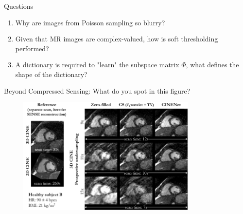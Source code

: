 \documentclass[aspectratio=169]{beamer}
\begin{document}
	\begin{frame}{Questions}
		\begin{enumerate}
			\item <1-> Why are images from Poisson sampling so blurry?
			
			\vspace{1em}
			\item <2-> Given that MR images are complex-valued, how is soft thresholding performed?
			
			\vspace{1em}
			\item <3-> A dictionary is required to "learn" the subspace matrix $\Phi$, what defines the shape of the dictionary?
		\end{enumerate}
	\end{frame}
	
	\begin{frame}{Beyond Compressed Sensing: What do you spot in this figure?}
		\begin{figure}
			\centering
			\includegraphics[width=0.8\textwidth]{figures/41598_2020_70551_Fig2_HTML.png}
		\end{figure}
	\end{frame}
	
\end{document}
